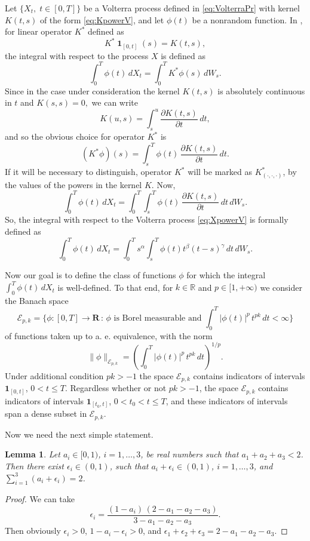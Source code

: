 \documentclass{article}
\DeclareMathOperator{\indicatorfun}{\mathbf{1}}
\def\dKdt(#1,#2){\frac{\partial K(#1,#2)}{\partial #1}}
\theoremstyle{plain}
\newtheorem{lemma}{Lemma}
\theoremstyle{remark}
\theoremstyle{definition}
\begin{document}
Let $\{X_t,\; t\mathbin{\in}[0,T]\}$
be a Volterra process defined in \eqref{eq:VolterraPr}
with kernel $K(t,s)$ of the form \eqref{eq:KpowerV},
and let $\phi(t)$ be a nonrandom function.
In \cite{Nualart2006},
for linear operator $K^*$ defined as
\[
	K^* \indicatorfun_{[0,t]} (s) = K(t,s),
\]
the integral with respect to the process $X$
is defined as
\[
	\int_0^T \phi(t) \, dX_t =
	\int_0^T K^*\phi (s) \, dW_s.
\]
Since in the case under consideration the kernel $K(t,s)$ is absolutely continuous
in $t$ and $K(s,s)=0,$ we can write
\[
	K(u,s) = \int_s^u \dKdt(t, s) \, dt,
\]
and so the obvious choice for operator $K^*$ is
\[
	(K^*\phi) (s) = \int_s^T \phi(t) \, \dKdt(t,s)\, dt.
\]
If it will be necessary to distinguish, operator $K^*$ will be marked as $K_{(\cdot,\cdot,\cdot)}^*$, by the values of the powers in the kernel $K$.
Now, 
\[
	\int_0^T \phi(t) \, dX_t
	= \int_0^T \int_s^T \phi(t) \, \dKdt(t,s) \, dt \, dW_s .
\]
So, the integral with respect
to the Volterra process \eqref{eq:XpowerV}
is formally defined as
\begin{equation}
	\label{eq:defLPI3Kernel}
\int_0^T \phi(t) \, dX_t = \int_0^T s^\alpha \int_s^T \phi(t) t^\beta (t-s)^\gamma \, dt \, dW_s.
\end{equation}

Now our goal is to define the class of functions $\phi$
for which the integral $\int_0^T \phi(t)\, dX_t$
is well-defined.
To that end, for $k\in  \mathbb{R}$ and $p\in[1,+\infty) $ we consider the Banach space
\[
	\mathcal{E}_{p,k} = \biggl\{\phi : [0,T]\mathbin{\to}
	\mathbf{R} \,:\,
	\mbox{$\phi$ is Borel measurable and~}
	\int_0^T |\phi(t)|^p\, t^{pk} \, dt < \infty\biggr\}
\]
of functions taken up to a. e.\@{} equivalence,
with the norm
\[
	\|\phi\|_{\mathcal{E}_{p,k}}
	= \left( \int_0^T |\phi(t)|^p \, t^{pk} \, dt
	\right)^{1/p} .
\]
Under additional condition $pk>-1$ the space
$\mathcal{E}_{p,k}$ contains indicators of intervals
$\mathbf{1}_{[0,t]}$, $0\mathbin{<}t\mathbin{\le}T$.
Regardless whether or not $pk>-1$,
the space
$\mathcal{E}_{p,k}$ contains indicators of intervals
$\mathbf{1}_{[t_0,t]}$, $0\mathbin{<}t_0\mathbin{<}t\mathbin{\le}T$,
and these indicators of intervals span
a dense subset in $\mathcal{E}_{p,k}$.

Now we need the next simple statement.

\begin{lemma}\label{lem:X123e3}
Let $a_i\in [0,1)$, $i=1,\ldots,3$,
be real numbers such that $a_1+a_2+a_3<2$.
Then there exist $\epsilon_i\in (0,1)$,
such that $a_i +  \epsilon_i\in(0,1)$,
$i=1,\ldots,3$,
and $\sum_{i=1}^3 (a_i+\epsilon_i) = 2$.
\end{lemma}
\begin{proof}
We can take
\[
\epsilon_i = \frac{(1-a_i) \, (2 - a_1 - a_2 - a_3)}
{3 - a_1 - a_2 - a_3}.
\]
Then  obviously
$\epsilon_i>0$,  $1-a_i-\epsilon_i>0$, and
 $\epsilon_1+\epsilon_2+\epsilon_3
= 2 - a_1 - a_2 -a_3$.
\end{proof}
\end{document}
